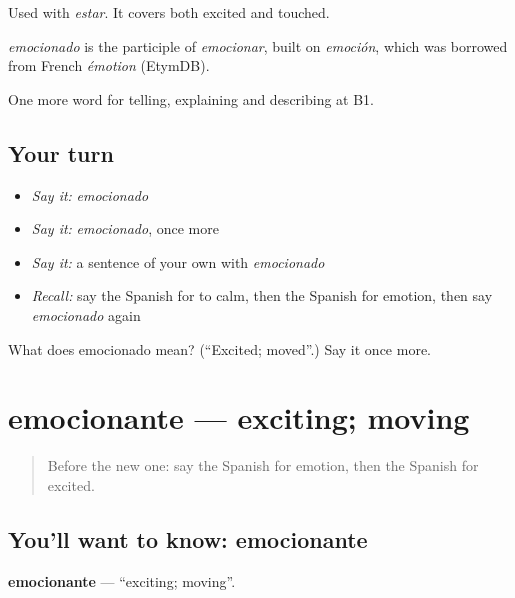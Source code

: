 Used with \emph{estar}. It covers both excited and touched.

\begin{cousinweb}
\emph{emocionado} is the participle of \emph{emocionar}, built on \emph{emoción}, which was borrowed from French \emph{émotion} (EtymDB).
\end{cousinweb}

\begin{grammarlens}[title={What you've built}]
One more word for telling, explaining and describing at B1.
\end{grammarlens}

\subsection*{Your turn}
\begin{itemize}
\raggedright
  \item \emph{Say it:} \emph{emocionado}
  \item \emph{Say it:} \emph{emocionado}, once more
  \item \emph{Say it:} a sentence of your own with \emph{emocionado}
  \item \emph{Recall:} say the Spanish for to calm, then the Spanish for emotion, then say \emph{emocionado} again
\end{itemize}

\begin{tcolorbox}[breakable,colback=teal!4,colframe=teal!35!black,title={Before you move on}]
What does emocionado mean? (\textquotedblleft{}Excited; moved\textquotedblright{}.) Say it once more.
\end{tcolorbox}
\section[emocionante]{emocionante — exciting; moving}

\label{lesson:ES-C711-emocionante}



\begin{quote}
Before the new one: say the Spanish for emotion, then the Spanish for excited.
\end{quote}

\subsection*{You'll want to know: emocionante}
\textbf{emocionante} — \textquotedblleft{}exciting; moving\textquotedblright{}.


